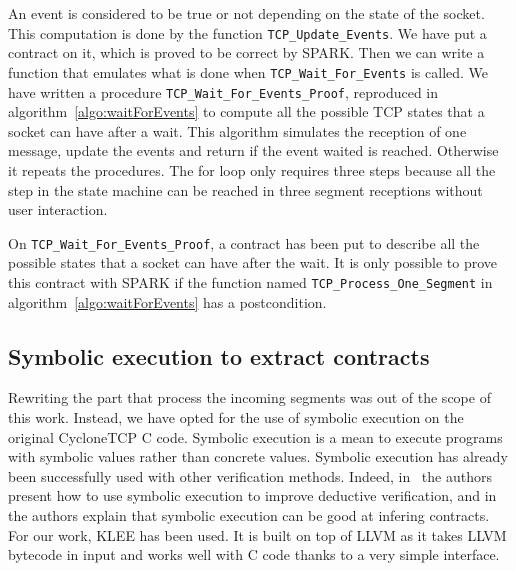 \documentclass[conference]{IEEEtran}
\def\spark#1{\lstinline[language=Ada]{#1}}
\begin{document}
An event is considered to be true or not depending on the state of the socket.
This computation is done by the function \spark{TCP_Update_Events}. We have put
a contract on it, which is proved to be correct by SPARK. Then we can write a
function that emulates what is done when \spark{TCP_Wait_For_Events} is called.
We have written a procedure \spark{TCP_Wait_For_Events_Proof}, reproduced in
algorithm~\ref{algo:waitForEvents} to compute all the possible TCP states that a
socket can have after a wait. This algorithm simulates the reception of
one message, update the events and return if the event waited is reached.
Otherwise it repeats the procedures. The for loop only requires three steps
because all the step in the state machine can be reached in three segment
receptions without user interaction.

On \spark{TCP_Wait_For_Events_Proof}, a contract has been put to describe all
the possible states that a socket can have after the wait. It is only possible
to prove this contract with SPARK if the function named
\spark{TCP_Process_One_Segment} in algorithm~\ref{algo:waitForEvents}
has a postcondition.

\subsection{Symbolic execution to extract contracts}

Rewriting the part that process the incoming segments was out of the scope of
this work. Instead, we have opted for the use of symbolic execution on the
original CycloneTCP C code.
Symbolic execution is a mean to execute programs with symbolic values rather
than concrete values. Symbolic execution has already been successfully
used with other verification methods.
Indeed, in~\cite{vanoverberghe2008using} the authors present how to use symbolic
execution to improve deductive verification, and in~\cite{kassios2012comparing}
the authors explain that symbolic execution can be good at infering contracts.
For our work, KLEE has been used. It is built on top of LLVM as it takes LLVM
bytecode in input and works well with C code thanks to a very simple interface.
\end{document}
